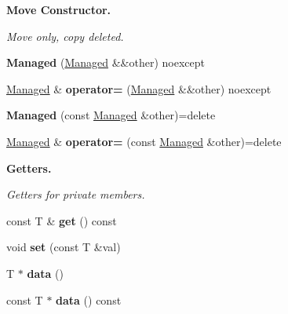 \begin{Indent}\textbf{ Move Constructor.}\par
{\em Move only, copy deleted. }\begin{DoxyCompactItemize}
\item 
\mbox{\label{classblaze_1_1util_1_1Managed_a38a5ed8b4d90eeaacf1b97781ccb0391}} 
{\bfseries Managed} (\hyperlink{classblaze_1_1util_1_1Managed}{Managed} \&\&other) noexcept
\item 
\mbox{\label{classblaze_1_1util_1_1Managed_a3f2071a6c55e46a11fa5ccfec2a9460e}} 
\hyperlink{classblaze_1_1util_1_1Managed}{Managed} \& {\bfseries operator=} (\hyperlink{classblaze_1_1util_1_1Managed}{Managed} \&\&other) noexcept
\item 
\mbox{\label{classblaze_1_1util_1_1Managed_aae50bb22f679b879b22ad85ef0152d98}} 
{\bfseries Managed} (const \hyperlink{classblaze_1_1util_1_1Managed}{Managed} \&other)=delete
\item 
\mbox{\label{classblaze_1_1util_1_1Managed_a08989e6618e83c986eff4128af718c56}} 
\hyperlink{classblaze_1_1util_1_1Managed}{Managed} \& {\bfseries operator=} (const \hyperlink{classblaze_1_1util_1_1Managed}{Managed} \&other)=delete
\end{DoxyCompactItemize}
\end{Indent}
\begin{Indent}\textbf{ Getters.}\par
{\em Getters for private members. }\begin{DoxyCompactItemize}
\item 
\mbox{\label{classblaze_1_1util_1_1Managed_ac1a612afc93df83d118fad37ee943007}} 
const T \& {\bfseries get} () const
\item 
\mbox{\label{classblaze_1_1util_1_1Managed_a6c9d44536c57523c47a90c3e894b8635}} 
void {\bfseries set} (const T \&val)
\item 
\mbox{\label{classblaze_1_1util_1_1Managed_a33e5ec8a96266a682738b1b52b08d140}} 
T $\ast$ {\bfseries data} ()
\item 
\mbox{\label{classblaze_1_1util_1_1Managed_a1af9329ba6f5aa4c075da7bbdda46b16}} 
const T $\ast$ {\bfseries data} () const
\end{DoxyCompactItemize}
\end{Indent}
